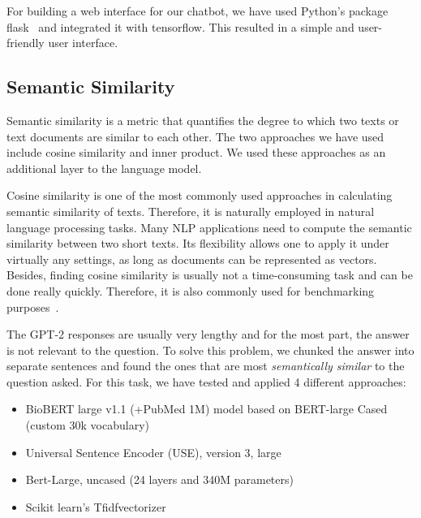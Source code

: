 \documentclass[sigconf,natbib=false]{acmart}
\begin{document}
\bigskip

\noindent For building a web interface for our chatbot, we have used Python's
package flask~\cite{flask} and integrated it with tensorflow. This resulted
in a simple and user-friendly user interface.


\subsection{Semantic Similarity}

Semantic similarity is a metric that quantifies the degree to which two texts
or text documents are similar to each other. The two approaches we have used
include cosine similarity and inner product. We used these approaches as an
additional layer to the language model.

\bigskip

\noindent Cosine similarity is one of the most commonly used approaches in
calculating semantic similarity of texts. Therefore, it is naturally employed
in natural language processing tasks. Many NLP applications need to
compute the semantic similarity between two short texts. Its flexibility allows
one to apply it under virtually any settings, as long as documents can be
represented as vectors.  Besides, finding cosine similarity is usually not a
time-consuming task and can be done really quickly. Therefore, it is also commonly
used for benchmarking purposes~\cite{cosine-benchmark}.

\bigskip

\noindent The GPT-2 responses are usually very lengthy and for the most part,
the answer is not relevant to the question. To solve this problem, we chunked
the answer into separate sentences and found the ones that are most
\textit{semantically similar} to the question asked. For this task, we have
tested and applied 4 different approaches:

\begin{itemize}
  \item BioBERT large v1.1 (+PubMed 1M) model based on BERT-large Cased (custom 30k vocabulary)
  \item Universal Sentence Encoder (USE), version 3, large
  \item Bert-Large, uncased (24 layers and 340M parameters)
  \item Scikit learn's Tfidfvectorizer
\end{itemize}
\end{document}
